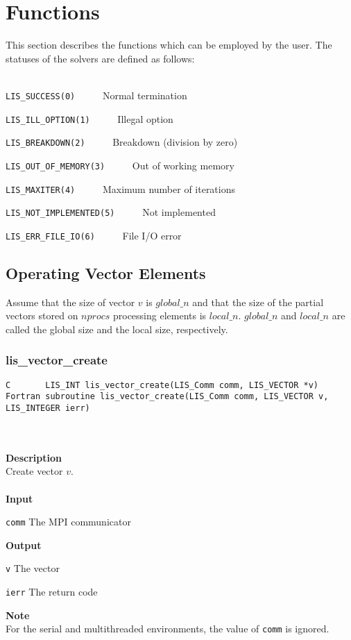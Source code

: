 \documentclass[a4paper]{article}
\newcommand{\namelistlabel}[1]{\mbox{#1}\hfill}
\newenvironment{namelist}[1]{%
\begin{list}{}
  {\let\makelabel\namelistlabel
  \settowidth{\labelwidth}{#1}
  \setlength{\leftmargin}{1.1\labelwidth}}
  }{%
\end{list}}
\begin{document}
\section{Functions}\label{sec:func}
This section describes the functions which can be employed by the user.
The statuses of the solvers are defined as follows: 
\\ \\ 
\noindent
\begin{namelist}{XXXXXXXXXXXXXXXXXXXX}
\item[\tt LIS\_SUCCESS(0)] ~~~~~Normal termination
\item[\tt LIS\_ILL\_OPTION(1)] ~~~~~Illegal option
\item[\tt LIS\_BREAKDOWN(2)] ~~~~~Breakdown (division by zero)
\item[\tt LIS\_OUT\_OF\_MEMORY(3)] ~~~~~Out of working memory
\item[\tt LIS\_MAXITER(4)] ~~~~~Maximum number of iterations
\item[\tt LIS\_NOT\_IMPLEMENTED(5)] ~~~~~Not implemented
\item[\tt LIS\_ERR\_FILE\_IO(6)] ~~~~~File I/O error
\end{namelist}

\newpage
\subsection{Operating Vector Elements}
Assume that the size of vector $v$ is $global\_n$ and that the size
of the partial vectors stored on $nprocs$ processing elements 
is $local\_n$. $global\_n$ and $local\_n$ 
are called the global size and the local size, respectively.

\subsubsection{lis\_vector\_create}
\begin{screen}
\verb|C       LIS_INT lis_vector_create(LIS_Comm comm, LIS_VECTOR *v)|\\
\verb|Fortran subroutine lis_vector_create(LIS_Comm comm, LIS_VECTOR v, LIS_INTEGER ierr)| 
\end{screen}
\\ \\
\noindent
{\bf Description}\\
\indent
Create vector $v$.
\\ \\
\noindent
{\bf Input}
\begin{namelist}{XXXXXXXXXXXXXXXXXXXX}
\item[\tt comm] The MPI communicator
\end{namelist}
{\bf Output}
\begin{namelist}{XXXXXXXXXXXXXXXXXXXX}
\item[\tt v] The vector
\item[\tt ierr] The return code
\end{namelist}
{\bf Note}\\
\indent
For the serial and multithreaded environments, the value of {\tt comm} is ignored.
\end{document}
